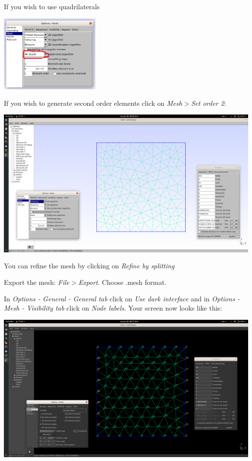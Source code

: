 If you wish to use quadrilaterals

\begin{center}
\includegraphics[width=5cm]{images/app_gmsh/gmsh_02}
\end{center}

If you wish to generate second order elements click on {\sl Mesh$>$Set order 2}:

\includegraphics[width=15cm]{images/app_gmsh/gmsh_04}

You can refine the mesh by clicking on {\sl Refine by splitting}

Export the mesh: {\sl File$>$Export}. Choose .mesh format. 

In {\sl Options - General - General tab} click on {\sl Use dark interface} 
and in {\sl Options - Mesh - Visibility tab} click on {\sl Node labels}. Your screen now 
looks like this:

\includegraphics[width=15cm]{images/app_gmsh/gmsh_05}

